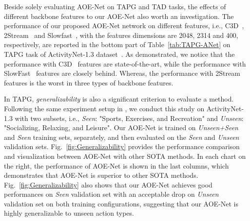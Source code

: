 \documentclass[sn-mathphys]{sn-jnl}
\theoremstyle{thmstyleone}\newtheorem{theorem}{Theorem}\newtheorem{proposition}[theorem]{Proposition}
\theoremstyle{thmstyletwo}\newtheorem{example}{Example}\newtheorem{remark}{Remark}
\theoremstyle{thmstylethree}\newtheorem{definition}{Definition}
\begin{document}
Beside solely evaluating AOE-Net on TAPG and TAD tasks, the effects of different backbone features to our AOE-Net also worth an investigation. 
The performance of our proposed AOE-Net network on different features, i.e., C3D~\cite{C3D}, 2Stream~\cite{2_stream_1} and Slowfast~\cite{SlowFast}, with the features dimensions are 2048, 2314 and 400, respectively, are reported in the bottom part of Table~\ref{tab:TAPG-ANet} on TAPG task of ActivityNet-1.3 dataset~\cite{caba2015activitynet}. As demonstrated, we notice that the performance with C3D~\cite{C3D} features are state-of-the-art, while the performance with SlowFast~\cite{SlowFast} features are closely behind. Whereas, the performance with 2Stream~\cite{2_stream_1} features is the worst in three types of backbone features.

In TAPG, \emph{generalizability} is also a significant criterion to evaluate a method. Following the same experiment setup in \cite{lin2018bsn, bmn, dbg, tsi_accv, KhoaVo_Access}, we conduct this study on ActivityNet-1.3 with two subsets, i.e., \textit{Seen}: "Sports, Exercises, and Recreation" and \textit{Unseen}: "Socializing, Relaxing, and Leisure". Our AOE-Net is trained on \textit{Unseen+Seen} and \textit{Seen} training sets, separately, and then evaluated on the \textit{Seen} and \textit{Unseen} validation sets. Fig.~\ref{fig:Generalizability} provides the performance comparison and visualization between AOE-Net with other SOTA methods. In each chart on the right, the performance of AOE-Net is shown in the last columns, which demonstrates that AOE-Net is superior to other SOTA methods. Fig.~\ref{fig:Generalizability} also shows that our AOE-Net achieves good performances on \textit{Seen} validation set with an acceptable drop on \textit{Unseen} validation set on both training configurations, suggesting that our AOE-Net is highly generalizable to unseen action types.
\end{document}
